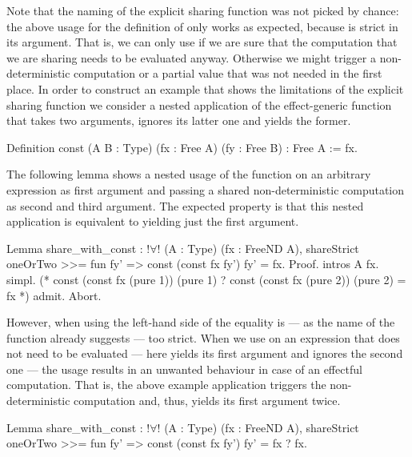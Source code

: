 Note that the naming of the explicit sharing function was not picked by chance: the above usage for the definition of  only works as expected, because  is strict in its argument.
That is, we can only use  if we are sure that the computation that we are sharing needs to be evaluated anyway.
Otherwise we might trigger a non\--deterministic computation or a partial value that was not needed in the first place.
In order to construct an example that shows the limitations of the explicit sharing function we consider a nested application of the effect\--generic function  that takes two arguments, ignores its latter one and yields the former.

\begin{coqcode}
Definition const (A B : Type) (fx : Free A) (fy : Free B) : Free A :=
  fx.
\end{coqcode}

The following lemma shows a nested usage of the function  on an arbitrary expression as first argument and passing a shared non\--deterministic computation as second and third argument.
The expected property is that this nested application is equivalent to yielding just the first argument.

\begin{coqcode}
Lemma share_with_const : !$\forall$! (A : Type) (fx : FreeND A),
   shareStrict oneOrTwo >>= fun fy' => const (const fx fy') fy' = fx.
Proof.
  intros A fx.
  simpl.
  (*   const (const fx (pure 1)) (pure 1)
     ? const (const fx (pure 2)) (pure 2) = fx *)
  admit.
Abort.
\end{coqcode}

However, when using  the left\--hand side of the equality is --- as the name of the function already suggests --- too strict.
When we use  on an expression that does not need to be evaluated --- here  yields its first argument and ignores the second one --- the usage results in an unwanted behaviour in case of an effectful computation.
That is, the above example application triggers the non\--deterministic computation  and, thus, yields its first argument  twice.

\begin{coqcode}
Lemma share_with_const : !$\forall$! (A : Type) (fx : FreeND A),
  shareStrict oneOrTwo >>= fun fy' => const (const fx fy') fy' = fx ? fx.
\end{coqcode}

